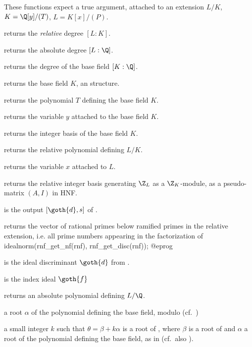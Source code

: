 These functions expect a true  argument, attached to an extension
$L/K$, $K = \Q[y]/(T)$, $L = K[x]/(P)$.

 returns the \emph{relative} degree
$[L:K]$.

 returns the absolute degree
$[L:\Q]$.

 returns the degree of the base
field $[K:\Q]$.

 returns the base field $K$, an 
structure.

 returns the polynomial $T$ defining the
base field $K$.

 returns the variable $y$ attached to the
base field $K$.

 returns the integer basis
of the base field $K$.

 returns the relative polynomial defining
$L/K$.

 returns the variable $x$ attached to $L$.

 returns the relative integer basis generating
$\Z_L$ as a $\Z_K$-module, as a pseudo-matrix $(A,I)$ in HNF.

 is the output $[\goth{d}, s]$
 of .

 returns the vector of rational
primes below ramified primes in the relative extension, i.e. all prime
numbers appearing in the factorization of
\bprog
  idealnorm(rnf_get_nf(rnf), rnf_get_disc(rnf));
@eprog

 is the ideal discriminant $\goth{d}$
from .

 is the index ideal $\goth{f}$

 returns an absolute polynomial defining
$L/\Q$.

 a root $\alpha$ of the polynomial
defining the base field, modulo  (cf.~)

a small integer $k$ such that $\theta = \beta + k\alpha$ is a root of
, where $\beta$ is a root of 
and $\alpha$ a root of the polynomial defining the base field,
as in  (cf.~also ).

